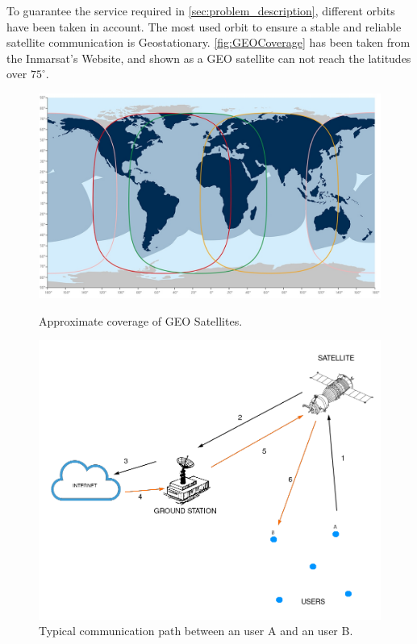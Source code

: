 To guarantee the service required in \autoref{sec:problem_description}, different orbits have been taken in account.
The most used orbit to ensure a stable and reliable satellite communication is Geostationary.
\autoref{fig:GEOCoverage} has been taken from the Inmarsat's Website, and shown as a GEO satellite can not reach the latitudes over $75^\circ$. 

\begin{figure}
	\centering
	\begin{minipage}{0.45\textwidth}
		\includegraphics[width=\textwidth]{figures/GEOCoverage.jpeg}
		\caption{Approximate coverage of GEO Satellites.}
		\label{fig:GEOCoverage}
	\end{minipage}\hspace{0.5cm}
	\begin{minipage}{0.45\textwidth}
		\includegraphics[width=\textwidth]{figures/System_topology_noBG.png}
		\caption{Typical communication path between an user A and an user B.}
	\end{minipage}
\end{figure}
